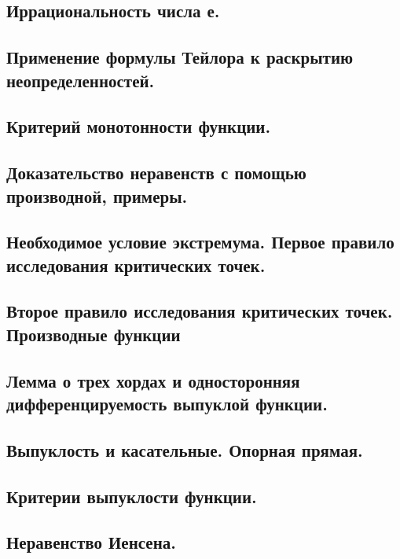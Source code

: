 \documentclass[12pt, a4paper]{article}
\begin{document}
\subsection{Иррациональность числа е.}

\subsection{Применение формулы Тейлора к раскрытию неопределенностей.}

\subsection{Критерий монотонности функции.}

\subsection{Доказательство неравенств с помощью производной, примеры.}

\subsection{Необходимое условие экстремума. Первое правило исследования критических точек.}

\subsection{Второе правило исследования критических точек. Производные функции}

\subsection{Лемма о трех хордах и односторонняя дифференцируемость выпуклой функции.}

\subsection{Выпуклость и касательные. Опорная прямая.}

\subsection{Критерии выпуклости функции.}

\subsection{Неравенство Иенсена.}
\end{document}
